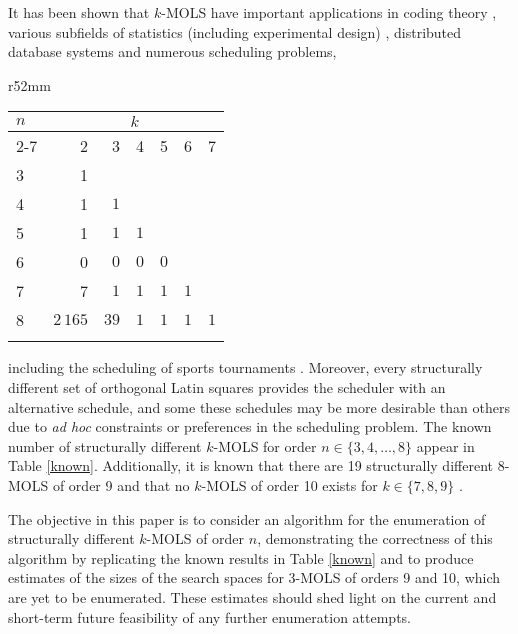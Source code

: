 \documentclass[11pt, a4paper]{article}
\newcommand{\lat}{Latin square}
\newcounter{ls}
\begin{document}
It has been shown that $k$-MOLS  have important applications in coding theory \cite{laywine}, various subfields of statistics (including experimental design)   \cite{fisher1, fisher2}, distributed database systems \cite{Abdel} and numerous scheduling problems,
\begin{wraptable}{r}{52mm}
\begin{tabular}{lrrrrrr}
\toprule
 $n$ &  \multicolumn{6}{c}{$k$}\\ \cmidrule(lr){2-7}
 &  \multicolumn{1}{r}{2} & \multicolumn{1}{r}{3} &\multicolumn{1}{r}{4} & \multicolumn{1}{r}{5} & \multicolumn{1}{r}{6} & \multicolumn{1}{r}{7} \\ \midrule \midrule
  3 & 1 &   &    &     &    &       \\ 
  4 & 1 & $1$ &    &     &    &       \\ 
  5& 1 & $1$ & $1$  &     &    &       \\
  6& 0 & $0$ & $0$  & $0$   &    &     \\
  7 & 7 & $1$ & $1$  & $1$   & $1$  &      \\ 
  8 & $2\,165$ & $39$ & $1$  & $1$   & $1$  & $1$    \\ \bottomrule \smallskip
\end{tabular}
\caption{The number of structurally different $k$-MOLS of order $n$ for $n=\{3, 4,\ldots, 8$\}.}
\label{known}
\end{wraptable}  
including the scheduling  of sports tournaments  \cite{keedwell2000designing,kidd2010tabu,robinson}.  Moreover,  every  structurally different set  of orthogonal \lat s provides  the scheduler with an alternative schedule, and some these schedules may be more desirable than others due to \emph{ad hoc} constraints or preferences in the scheduling problem. The known number of structurally different $k$-MOLS for order $n\in\{3,4,\ldots, 8\}$ appear in Table \ref{known}. Additionally, it is known that there are 19 structurally different 8-MOLS of order 9 \cite{owens1995complete} and that no $k$-MOLS of order 10 exists for $k\in \{7,8,9 \}$ \cite{dukes2012group, lam1989non}.

The objective in this paper is to consider an algorithm for the enumeration of structurally different $k$-MOLS of order $n$, demonstrating  the correctness of this algorithm by replicating the known results in Table \ref{known} and to produce estimates of the sizes of  the search spaces for $3$-MOLS of orders 9 and 10, which are yet to be enumerated. These estimates should shed light on the current and short-term future feasibility of any further enumeration attempts.
\end{document}
